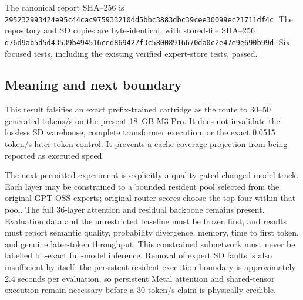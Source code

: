The canonical report SHA--256 is
\texttt{295232993424e95c44cac975933210dd5bbc3883dbc39cee30099ec21711df4c}.
The repository and SD copies are byte-identical, with stored-file SHA--256
\texttt{d76d9ab5d5d43539b494516ced869427f3c58008916670da0c2e47e9e690b99d}.
Six focused tests, including the existing verified expert-store tests, passed.

\subsection{Meaning and next boundary}

This result falsifies an exact prefix-trained cartridge as the route to
30--50 generated tokens/s on the present 18~GB M3 Pro.  It does not invalidate
the lossless SD warehouse, complete transformer execution, or the exact 0.0515
token/s later-token control.  It prevents a cache-coverage projection from being
reported as executed speed.

The next permitted experiment is explicitly a quality-gated changed-model
track.  Each layer may be constrained to a bounded resident pool selected from
the original GPT-OSS experts; original router scores choose the top four within
that pool.  The full 36-layer attention and residual backbone remains present.
Evaluation data and the unrestricted baseline must be frozen first, and results
must report semantic quality, probability divergence, memory, time to first
token, and genuine later-token throughput.  This constrained subnetwork must
never be labelled bit-exact full-model inference.  Removal of expert SD faults
is also insufficient by itself: the persistent resident execution boundary is
approximately 2.4 seconds per evaluation, so persistent Metal attention and
shared-tensor execution remain necessary before a 30-token/s claim is
physically credible.
